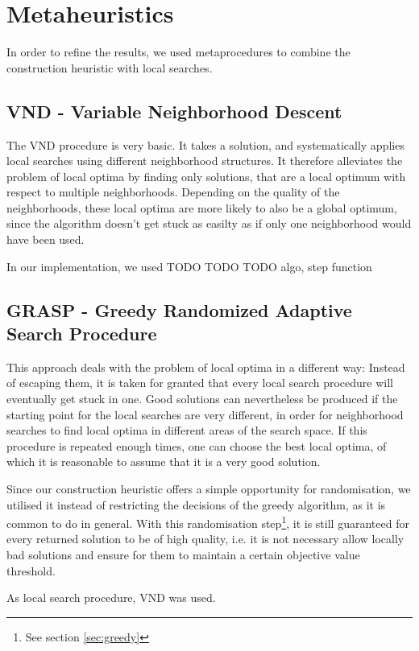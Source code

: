 \section{Metaheuristics}

In order to refine the results, we used metaprocedures to combine the construction heuristic with local searches.

\subsection{VND - Variable Neighborhood Descent}

The VND procedure is very basic. It takes a solution, and systematically applies local searches using different neighborhood structures. It therefore alleviates the problem of local optima by finding only solutions, that are a local optimum with respect to multiple neighborhoods. Depending on the quality of the neighborhoods, these local optima are more likely to also be a global optimum, since the algorithm doesn't get stuck as easilty as if only one neighborhood would have been used.

In our implementation, we used TODO TODO TODO algo, step function


\subsection{GRASP - Greedy Randomized Adaptive Search Procedure}

This approach deals with the problem of local optima in a different way: Instead of escaping them, it is taken for granted that every local search procedure will eventually get stuck in one. Good solutions can nevertheless be produced if the starting point for the local searches are very different, in order for neighborhood searches to find local optima in different areas of the search space. If this procedure is repeated enough times, one can choose the best local optima, of which it is reasonable to assume that it is a very good solution.

Since our construction heuristic offers a simple opportunity for randomisation, we utilised it instead of restricting the decisions of the greedy algorithm, as it is common to do in general. With this randomisation step\footnote{See section \ref{sec:greedy}}, it is still guaranteed for every returned solution to be of high quality, i.e. it is not necessary allow locally bad solutions and ensure for them to maintain a certain objective value threshold.

As local search procedure, VND was used.


